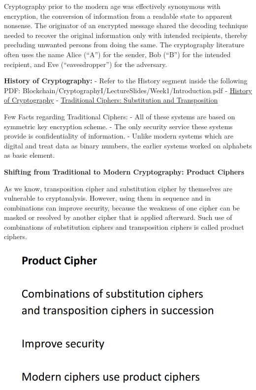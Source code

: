 \documentclass[11pt]{article}
\makeatletter
\def\maxwidth{\ifdim\Gin@nat@width>\linewidth\linewidth
    \else\Gin@nat@width\fi}
\let\Oldincludegraphics\includegraphics
\renewcommand{\includegraphics}[1]{\Oldincludegraphics[width=.8\maxwidth]{#1}}
\makeatother
\begin{document}
Cryptography prior to the modern age was effectively synonymous with
encryption, the conversion of information from a readable state to
apparent nonsense. The originator of an encrypted message shared the
decoding technique needed to recover the original information only with
intended recipients, thereby precluding unwanted persons from doing the
same. The cryptography literature often uses the name Alice (``A'') for
the sender, Bob (``B'') for the intended recipient, and Eve
(``eavesdropper'') for the adversary.

\textbf{History of Cryptography:} - Refer to the History segment inside
the following PDF:
Blockchain/CryptographyI/LectureSlides/Week1/Introduction.pdf -
\href{https://www.tutorialspoint.com/cryptography/origin_of_cryptography.htm}{History
of Cryptography} -
\href{https://www.tutorialspoint.com/cryptography/traditional_ciphers.htm}{Traditional
Ciphers: Substitution and Transposition}

Few Facts regarding Traditional Ciphers: - All of these systems are
based on symmetric key encryption scheme. - The only security service
these systems provide is confidentiality of information. - Unlike modern
systems which are digital and treat data as binary numbers, the earlier
systems worked on alphabets as basic element.

\textbf{Shifting from Traditional to Modern Cryptography: Product
Ciphers}

As we know, transposition cipher and substitution cipher by themselves
are vulnerable to cryptanalysis. However, using them in sequence and in
combinations can improve security, because the weakness of one cipher
can be masked or resolved by another cipher that is applied afterward.
Such use of combinations of substitution ciphers and transposition
ciphers is called product ciphers.

\includegraphics{./Images/ProductCiphers.png}
\end{document}
